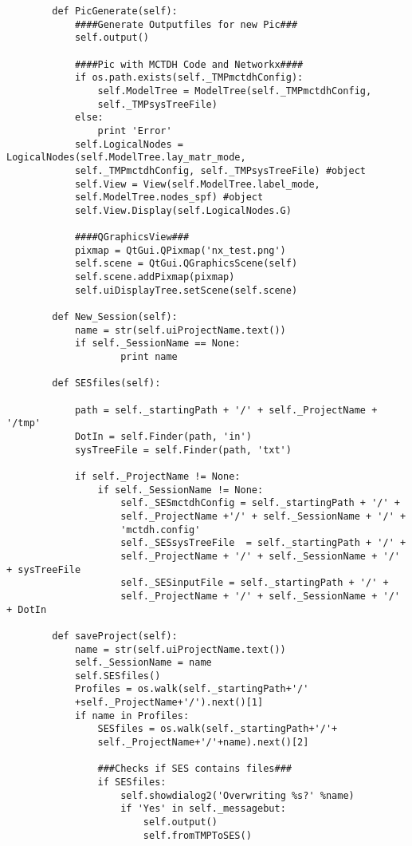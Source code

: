 \begin{verbatim}
        def PicGenerate(self):
            ####Generate Outputfiles for new Pic###
            self.output()
    
            ####Pic with MCTDH Code and Networkx####
            if os.path.exists(self._TMPmctdhConfig):
                self.ModelTree = ModelTree(self._TMPmctdhConfig, 
                self._TMPsysTreeFile)
            else:
                print 'Error'
            self.LogicalNodes = LogicalNodes(self.ModelTree.lay_matr_mode, 
            self._TMPmctdhConfig, self._TMPsysTreeFile) #object
            self.View = View(self.ModelTree.label_mode, 
            self.ModelTree.nodes_spf) #object
            self.View.Display(self.LogicalNodes.G) 
    
            ####QGraphicsView###
            pixmap = QtGui.QPixmap('nx_test.png')
            self.scene = QtGui.QGraphicsScene(self)
            self.scene.addPixmap(pixmap)
            self.uiDisplayTree.setScene(self.scene)
    
        def New_Session(self):
            name = str(self.uiProjectName.text())
            if self._SessionName == None:
                    print name
    
        def SESfiles(self):
            
            path = self._startingPath + '/' + self._ProjectName + '/tmp'
            DotIn = self.Finder(path, 'in')
            sysTreeFile = self.Finder(path, 'txt')
    
            if self._ProjectName != None:
                if self._SessionName != None:
                    self._SESmctdhConfig = self._startingPath + '/' + 
                    self._ProjectName +'/' + self._SessionName + '/' + 
                    'mctdh.config'
                    self._SESsysTreeFile  = self._startingPath + '/' + 
                    self._ProjectName + '/' + self._SessionName + '/' + sysTreeFile
                    self._SESinputFile = self._startingPath + '/' + 
                    self._ProjectName + '/' + self._SessionName + '/' + DotIn
    
        def saveProject(self):
            name = str(self.uiProjectName.text())
            self._SessionName = name
            self.SESfiles()
            Profiles = os.walk(self._startingPath+'/'
            +self._ProjectName+'/').next()[1]
            if name in Profiles:
                SESfiles = os.walk(self._startingPath+'/'+
                self._ProjectName+'/'+name).next()[2]
    
                ###Checks if SES contains files###        
                if SESfiles:
                    self.showdialog2('Overwriting %s?' %name)
                    if 'Yes' in self._messagebut:
                        self.output()  
                        self.fromTMPToSES()
                        

\end{verbatim}
